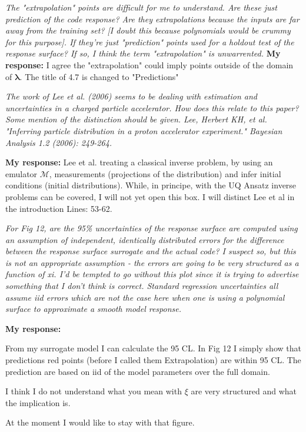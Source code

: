 \documentclass{article}
\newcommand{\atline}[1]{\color{red} Lines: #1\color{blue}}
\begin{document}
{\it 
The "extrapolation" points are difficult for me to understand. Are these 
just prediction of the code response? Are they extrapolations because 
the inputs are far away from the training set? [I doubt this because 
polynomials would be crummy for this purpose]. If they're just "prediction" 
points used for a holdout test of the response surface? If so, I think 
the term "extrapolation" is unwarrented. 
}
{\bf My response: }{\color{blue} I agree the "extrapolation" could imply points outside of the domain of $\mathbf{\lambda}$. The title of 4.7 is changed to "Predictions"} 

{\it 
The work of Lee et al. (2006) seems to be dealing with estimation 
and uncertainties in a charged particle accelerator. How does this 
relate to this paper? Some mention of the distinction should be 
given. 
Lee, Herbert KH, et al. "Inferring particle distribution in a 
proton accelerator experiment." Bayesian Analysis 1.2 (2006): 249-264. 
}

{\bf My response: }{\color{blue} Lee et al. treating a classical inverse problem, by using an emulator $\mathcal{M}$, measurements (projections of the distribution) and 
infer initial conditions (initial distributions).  While, in principe, with the UQ Ansatz inverse problems can be covered, I will not yet open this box. I will distinct Lee et al in the introduction \atline{53-62}.} 


{\it 
For Fig 12, are the 95\% uncertainties of the response surface are computed 
using an assumption of independent, identically distributed errors for 
the difference between the response surface surrogate and the actual 
code? I suspect so, but this is not an appropriate assumption - the 
errors are going to be very structured as a function of xi. I'd be tempted 
to go without this plot since it is trying to advertise something that I 
don't think is correct. Standard regression uncertainties all assume 
iid errors which are not the case here when one is using a polynomial surface 
to approximate a smooth model response. 
}

{\bf My response: }{\color{blue} From my surrogate model I can calculate the 95 CL.
In Fig 12 I simply show that predictions red points (before I called them Extrapolation) are within 95 CL. The prediction are based on iid of the model parameters over the 
full domain. 

I think I do not understand what you mean with $\xi$ are very structured and what the implication is.

At the moment I would like to stay with that figure.
} 
\end{document}
